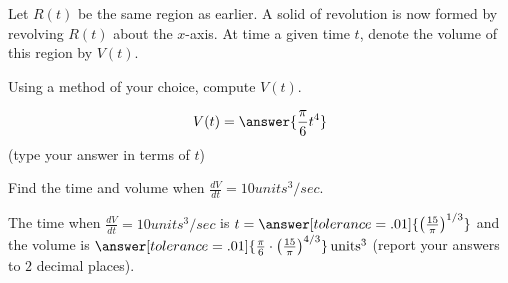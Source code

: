 \documentclass{ximera}
\author{Jim Talamo}
\begin{document}
\begin{exercise}
Let $R(t)$ be the same region as earlier.  A solid of revolution is now formed by revolving $R(t)$ about the $x$-axis.  At time a given time $t$, denote the volume of this region by $V(t)$.

Using a method of your choice, compute $V(t)$.

\[
V(t) = \answer{\frac{\pi}{6}t^4}
\]
(type your answer in terms of $t$)

\begin{exercise}
Find the time and volume when $\frac{dV}{dt} = 10 \unit{units^3/sec}$.

The time when $\frac{dV}{dt} = 10 \unit{units^3/sec}$ is $t= \answer[tolerance=.01]{\left(\frac{15}{\pi}\right)^{1/3}}$ and the volume is $\answer[tolerance=.01]{\frac{\pi}{6} \cdot \left(\frac{15}{\pi}\right)^{4/3} } \unit{units^3}$  (report your answers to $2$ decimal places). 

\end{exercise}

\end{exercise}
\end{document}
